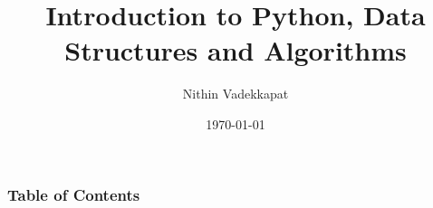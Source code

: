 \documentclass{beamer}
\title{Introduction to Python, Data Structures and Algorithms}
\author{Nithin Vadekkapat}
\date{\today}
\begin{document}
\begin{frame}
    \titlepage
\end{frame}

\begin{frame}
    \frametitle{Table of Contents}
    \tableofcontents
\end{frame}


% 
% 
% 
%
%
%

\end{document}
